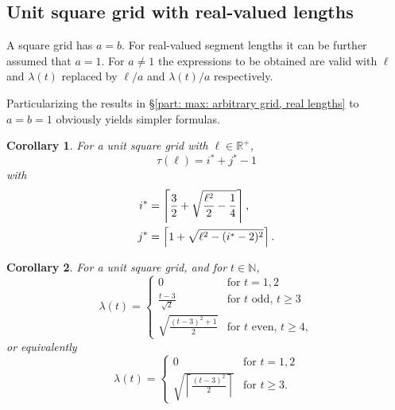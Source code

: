 \documentclass[12pt, a4paper]{article}
\let\Re\relax %
\DeclareMathOperator{\Re}{Re} %
\newcommand{\funt}{\tau} %
\newcommand{\funl}{\lambda} %
\newcommand{\len}{\ell} %
\newcommand{\tiles}{t} %
\newcommand{\isoli}{i^\ast}
\newcommand{\jsoli}{j^\ast}
\newtheorem{corollary}{Corollary}%
\begin{document}
\subsection{Unit square grid with real-valued lengths}
\label{part: max: unit square grid, real lengths}

A square grid has $a=b$. For real-valued segment lengths it can be further assumed that $a=1$. For $a \neq 1$ the expressions to be obtained are valid with $\len$ and $\funl(\tiles)$ replaced by $\len/a$ and $\funl(\tiles)/a$ respectively.

Particularizing the results in \S\ref{part: max: arbitrary grid, real lengths} to $a=b=1$ obviously yields simpler formulas.

\begin{corollary}
\label{cor: funt, sq, form}
For a unit square grid with $\len \in \mathbb R^+$,
\begin{equation}
\label{eq: cor: funt, sq, form}
\funt(\len) = \isoli+\jsoli-1
\end{equation}
with
\begin{align}
\label{eq: cor: funt, sq, form; i}
\isoli &= \left\lceil \frac 3 2 + \Re\sqrt{\frac{\len^2}{2} - \frac 1 4} \right\rceil, \\
\label{eq: cor: funt, sq, form; j}
\jsoli &= \left\lceil 1 + \sqrt{\len^2-(\isoli-2)^2} \right\rceil.
\end{align}
\end{corollary}

\begin{corollary}
\label{theo: funl, sq, form}
For a unit square grid, and for $\tiles \in \mathbb N$,
\begin{equation}
\funl(\tiles) = \begin{cases}
\displaystyle
0 & \text{for } \tiles =1, 2 \\[1.4mm]
\displaystyle
\frac{\tiles-3}{\sqrt{2}} & \text{for } \tiles \text{ odd, } \tiles \geq 3 \\[4.5mm]
\displaystyle
\sqrt{\frac{(\tiles-3)^2+1} {2}} & \text{for } \tiles \text{ even, } \tiles \geq 4,
\end{cases}
\end{equation}
or equivalently
\begin{equation}
\label{eq: theo: funt, sq, form; funl}
\funl(\tiles) = \begin{cases}
\displaystyle
0 & \text{for } \tiles =1, 2 \\[1.4mm]
\displaystyle
\sqrt{\left\lceil \frac{(\tiles-3)^2} {2} \right\rceil} & \text{for } \tiles \geq 3.
\end{cases}
\end{equation}
\end{corollary}
\end{document}
